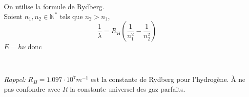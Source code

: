 \documentclass[a4paper]{article}
\begin{document}
\pagestyle{fancy}
\fancyhf{}
\setlength{\headheight}{15pt}

\begin{center}
	\large{}
\end{center}


On utilise la formule de Rydberg.\\
Soient \(n_1, n_2 \in \mathbb{N}^*\) tels que \(n_2 > n_1\),
\[\frac{1}{\lambda} = R_H\left(\frac{1}{n_1^2} - \frac{1}{n_2^2}\right)\]
\(E =h \nu\) donc\\
\begin{center}\\
\end{center}
\emph{Rappel: }\(R_H = 1.097\cdot 10^7 m^{-1}\) est la constante de Rydberg pour l'hydrogène. À ne pas confondre avec \(R\) la constante universel des gaz parfaits.
\end{document}
